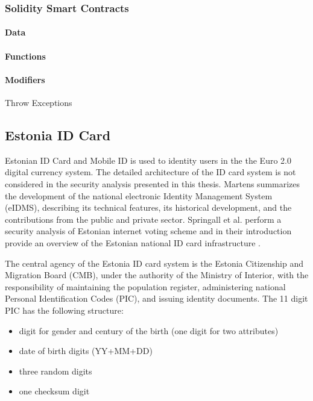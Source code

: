 \documentclass[a4paper,12pt]{article} %
\begin{document}
\subsubsection{Solidity Smart Contracts} \label{sssec:2:ethereum:soliditySmartContracts}

\paragraph*{Data}

\paragraph*{Functions}

\paragraph*{Modifiers}

Throw Exceptions

\subsection{Estonia ID Card} \label{ssec:2:estoniaIdCard}

Estonian ID Card and Mobile ID is used to identity users in the the Euro 2.0 digital currency system. The detailed architecture of the ID card system is not considered in the security analysis presented in this thesis. Martens summarizes the development of the national electronic Identity Management System (eIDMS), describing its technical features, its historical development, and the contributions from the public and private sector\cite{Martens2010electronicIdentity}. Springall et al. perform a security analysis of Estonian internet voting scheme and in their introduction provide an overview of the Estonian national ID card infrastructure \cite{estoniaInternetVoting}.

The central agency of the Estonia ID card system is the Estonia Citizenship and Migration Board (CMB), under the authority of the Ministry of Interior, with the responsibility of maintaining the population register, administering national Personal Identification Codes (PIC), and issuing identity documents. The 11 digit PIC has the following structure:

\begin{itemize}
	\item digit for gender and century of the birth (one digit for two attributes)
	\item date of birth digits (YY+MM+DD)
	\item three random digits
	\item one checksum digit
\end{itemize}
\end{document}
